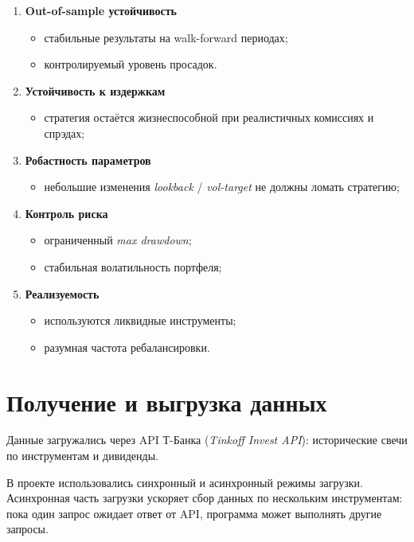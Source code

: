 \documentclass[12pt]{article}
\begin{document}
\begin{enumerate}
    \item \textbf{Out-of-sample устойчивость}
    \begin{itemize}
        \item стабильные результаты на walk-forward периодах;
        \item контролируемый уровень просадок.
    \end{itemize}

    \item \textbf{Устойчивость к издержкам}
    \begin{itemize}
        \item стратегия остаётся жизнеспособной при реалистичных комиссиях и спрэдах;
    \end{itemize}

    \item \textbf{Робастность параметров}
    \begin{itemize}
        \item небольшие изменения \textit{lookback} / \textit{vol-target} не должны ломать стратегию;
    \end{itemize}

    \item \textbf{Контроль риска}
    \begin{itemize}
        \item ограниченный \textit{max drawdown};
        \item стабильная волатильность портфеля;
    \end{itemize}

    \item \textbf{Реализуемость}
    \begin{itemize}
        \item используются ликвидные инструменты;
        \item разумная частота ребалансировки.
    \end{itemize}
\end{enumerate}
\section{Получение и выгрузка данных}

Данные загружались через API Т-Банка (\textit{Tinkoff Invest API}): исторические свечи по инструментам и дивиденды.

В проекте использовались синхронный и асинхронный режимы загрузки. Асинхронная часть загрузки ускоряет сбор данных по нескольким инструментам: пока один запрос ожидает ответ от API, программа может выполнять другие запросы.
\end{document}

